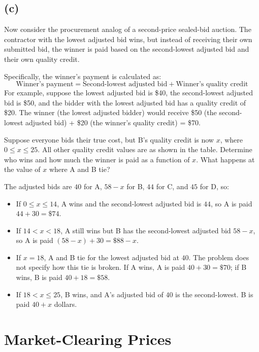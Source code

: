 \documentclass[newpages, arabicsubsec]{assignment}
\begin{document}
\subsection*{(c)}
\begin{problem}
Now consider the procurement analog of a second-price sealed-bid auction. The contractor with the lowest adjusted bid wins, but instead of receiving their own submitted bid, the winner is paid based on the second-lowest adjusted bid and their own quality credit.

Specifically, the winner's payment is calculated as:
\[
    \text{Winner's payment}
    =
    \text{Second-lowest adjusted bid}
    +
    \text{Winner's quality credit}
\]
For example, suppose the lowest adjusted bid is \$40, the second-lowest adjusted bid is \$50, and the bidder with the lowest adjusted bid has a quality credit of \$20. The winner (the lowest adjusted bidder) would receive \$50 (the second-lowest adjusted bid) + \$20 (the winner's quality credit) = \$70.

Suppose everyone bids their true cost, but B's quality credit is now \(x\), where \(0 \leq x \leq 25\). All other quality credit values are as shown in the table. Determine who wins and how much the winner is paid as a function of \(x\). What happens at the value of \(x\) where A and B tie?
\end{problem}
\begin{solution}
    The adjusted bids are \(40\) for A, \(58-x\) for B, \(44\) for C, and \(45\) for D, so:

    \begin{itemize}
        \item If \(0\leq x\leq14\), A wins and the second-lowest adjusted bid is \(44\), so A is paid \(44+30=\$74\).
        \item If \(14<x<18\), A still wins but B has the second-lowest adjusted bid \(58-x\), so A is paid \((58-x)+30=\$88-x\).
        \item If \(x=18\), A and B tie for the lowest adjusted bid at \(40\). The problem does not specify how this tie is broken. If A wins, A is paid \(40+30=\$70\); if B wins, B is paid \(40+18=\$58\).
        \item If \(18<x\leq25\), B wins, and A's adjusted bid of \(40\) is the second-lowest. B is paid \(40+x\) dollars.
    \end{itemize}
\end{solution}

\section{Market-Clearing Prices}
\end{document}
